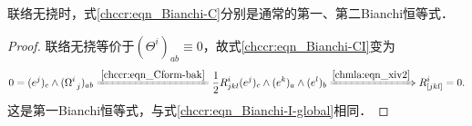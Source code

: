 \begin{theorem}\label{chccr:thm_bianchi-12}
    联络无挠时，式\eqref{chccr:eqn_Bianchi-C}分别是通常的第一、第二Bianchi恒等式．
\end{theorem}
\begin{proof}
    联络无挠等价于$(\Theta ^{i})_{ab} \equiv 0$，故式\eqref{chccr:eqn_Bianchi-CI}变为
    \begin{equation}\label{chccr:eqn_Bianchi-I}
        0 = (e^j)_c \wedge (\Omega_{\hphantom{a} j} ^{i})_{ab}
        \xlongequal{\ref{chccr:eqn_Cform-bak}} \frac{1}{2}R_{jkl}^i
        (e^j)_c \wedge (e^k)_a \wedge (e^l)_b
        \xRightarrow{\ref{chmla:eqn_xiv2}}  %
        R_{[jkl]}^i =0 .
    \end{equation}
    这是第一Bianchi恒等式，与式\eqref{chccr:eqn_Bianchi-I-global}相同．



\end{proof}

